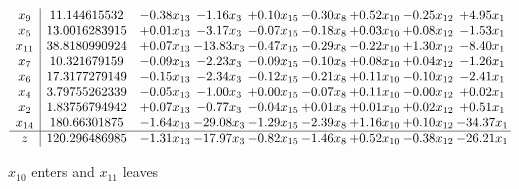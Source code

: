 \documentclass[9pt]{article}
\begin{document}
 \[\begin{array}{c| c c@{\hskip 2pt} c@{\hskip 2pt} c@{\hskip 2pt} c@{\hskip 2pt} c@{\hskip 2pt} c@{\hskip 2pt} c@{\hskip 2pt} }
 x_{9}   &  11.144615532 & -0.38 x_{13} & -1.16 x_{3} & +  0.10 x_{15} & -0.30 x_{8} & +  0.52 x_{10} & -0.25 x_{12} & +  4.95 x_{1}\\
 x_{5}   &  13.0016283915 & +  0.01 x_{13} & -3.17 x_{3} & -0.07 x_{15} & -0.18 x_{8} & +  0.03 x_{10} & +  0.08 x_{12} & -1.53 x_{1}\\
 x_{11}   &  38.8180990924 & +  0.07 x_{13} & -13.83 x_{3} & -0.47 x_{15} & -0.29 x_{8} & -0.22 x_{10} & +  1.30 x_{12} & -8.40 x_{1}\\
 x_{7}   &  10.321679159 & -0.09 x_{13} & -2.23 x_{3} & -0.09 x_{15} & -0.10 x_{8} & +  0.08 x_{10} & +  0.04 x_{12} & -1.26 x_{1}\\
 x_{6}   &  17.3177279149 & -0.15 x_{13} & -2.34 x_{3} & -0.12 x_{15} & -0.21 x_{8} & +  0.11 x_{10} & -0.10 x_{12} & -2.41 x_{1}\\
 x_{4}   &  3.79755262339 & -0.05 x_{13} & -1.00 x_{3} & +  0.00 x_{15} & -0.07 x_{8} & +  0.11 x_{10} & -0.00 x_{12} & +  0.02 x_{1}\\
 x_{2}   &  1.83756794942 & +  0.07 x_{13} & -0.77 x_{3} & -0.04 x_{15} & +  0.01 x_{8} & +  0.01 x_{10} & +  0.02 x_{12} & +  0.51 x_{1}\\
 x_{14}   &  180.66301875 & -1.64 x_{13} & -29.08 x_{3} & -1.29 x_{15} & -2.39 x_{8} & +  1.16 x_{10} & +  0.10 x_{12} & -34.37 x_{1}\\
\hline
z    &  120.296486985 & -1.31 x_{13} & -17.97 x_{3} & -0.82 x_{15} & -1.46 x_{8} & +  0.52 x_{10} & -0.38 x_{12} & -26.21 x_{1}\\
\end{array}\]


 $ x_{10} $ enters and $ x_{11} $ leaves 
\end{document}
